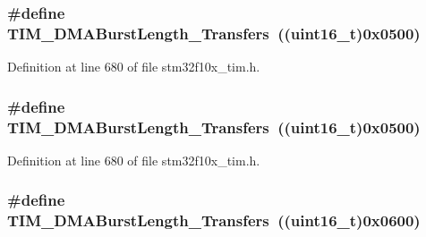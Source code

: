 \subsubsection[{\texorpdfstring{T\+I\+M\+\_\+\+D\+M\+A\+Burst\+Length\+\_\+6\+Transfers}{TIM_DMABurstLength_6Transfers}}]{\setlength{\rightskip}{0pt plus 5cm}\#define T\+I\+M\+\_\+\+D\+M\+A\+Burst\+Length\+\_\+Transfers~(({\bf uint16\+\_\+t})0x0500)}\hypertarget{group___t_i_m___d_m_a___burst___length_ga8be40a21654eea72e9c1bf9922675b22}{}\label{group___t_i_m___d_m_a___burst___length_ga8be40a21654eea72e9c1bf9922675b22}


Definition at line 680 of file stm32f10x\+\_\+tim.\+h.

\subsubsection[{\texorpdfstring{T\+I\+M\+\_\+\+D\+M\+A\+Burst\+Length\+\_\+6\+Transfers}{TIM_DMABurstLength_6Transfers}}]{\setlength{\rightskip}{0pt plus 5cm}\#define T\+I\+M\+\_\+\+D\+M\+A\+Burst\+Length\+\_\+Transfers~(({\bf uint16\+\_\+t})0x0500)}\hypertarget{group___t_i_m___d_m_a___burst___length_ga8be40a21654eea72e9c1bf9922675b22}{}\label{group___t_i_m___d_m_a___burst___length_ga8be40a21654eea72e9c1bf9922675b22}


Definition at line 680 of file stm32f10x\+\_\+tim.\+h.

\subsubsection[{\texorpdfstring{T\+I\+M\+\_\+\+D\+M\+A\+Burst\+Length\+\_\+7\+Transfers}{TIM_DMABurstLength_7Transfers}}]{\setlength{\rightskip}{0pt plus 5cm}\#define T\+I\+M\+\_\+\+D\+M\+A\+Burst\+Length\+\_\+Transfers~(({\bf uint16\+\_\+t})0x0600)}\hypertarget{group___t_i_m___d_m_a___burst___length_gaf2ae83bd73b0e92b73e5ebfc11f9bfad}{}\label{group___t_i_m___d_m_a___burst___length_gaf2ae83bd73b0e92b73e5ebfc11f9bfad}


